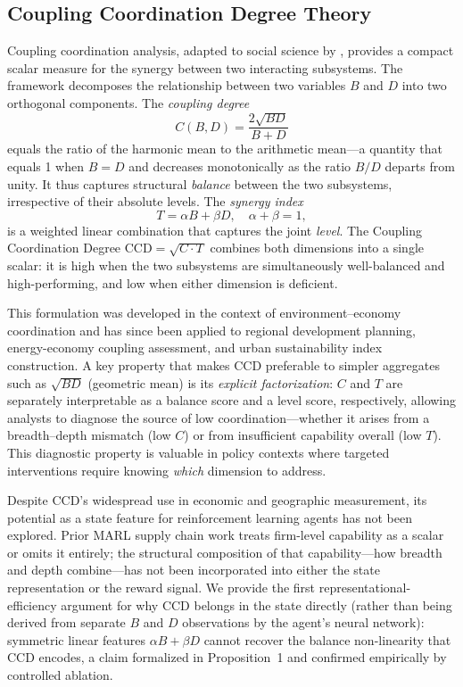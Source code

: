 \documentclass[11pt,a4paper]{article}
\theoremstyle{plain}
\theoremstyle{definition}
\newcommand{\CCD}{\mathrm{CCD}}
\begin{document}
\subsection{Coupling Coordination Degree Theory}

Coupling coordination analysis, adapted to social science by \citet{liao1999quantitative},
provides a compact scalar measure for the synergy between two interacting subsystems.  The
framework decomposes the relationship between two variables $B$ and $D$ into two orthogonal
components.  The \emph{coupling degree}
\[
  C(B,D) = \frac{2\sqrt{BD}}{B+D}
\]
equals the ratio of the harmonic mean to the arithmetic mean---a quantity that equals 1
when $B=D$ and decreases monotonically as the ratio $B/D$ departs from unity.  It thus
captures structural \emph{balance} between the two subsystems, irrespective of their
absolute levels.  The \emph{synergy index}
\[
  T = \alpha B + \beta D, \quad \alpha + \beta = 1,
\]
is a weighted linear combination that captures the joint \emph{level}.  The Coupling
Coordination Degree $\CCD = \sqrt{C \cdot T}$ combines both dimensions into a single
scalar: it is high when the two subsystems are simultaneously well-balanced and
high-performing, and low when either dimension is deficient.

This formulation was developed in the context of environment--economy coordination
\citep{liao1999quantitative} and has since been applied to regional development planning,
energy-economy coupling assessment, and urban sustainability index construction.  A key
property that makes CCD preferable to simpler aggregates such as $\sqrt{BD}$ (geometric
mean) is its \emph{explicit factorization}: $C$ and $T$ are separately interpretable as a
balance score and a level score, respectively, allowing analysts to diagnose the source of
low coordination---whether it arises from a breadth--depth mismatch (low $C$) or from
insufficient capability overall (low $T$).  This diagnostic property is valuable in
policy contexts where targeted interventions require knowing \emph{which} dimension to
address.

Despite CCD's widespread use in economic and geographic measurement, its potential as a
state feature for reinforcement learning agents has not been explored.  Prior MARL supply
chain work treats firm-level capability as a scalar or omits it entirely; the structural
composition of that capability---how breadth and depth combine---has not been incorporated
into either the state representation or the reward signal.  We provide the first
representational-efficiency argument for why CCD belongs in the state directly (rather
than being derived from separate $B$ and $D$ observations by the agent's neural network):
symmetric linear features $\alpha B + \beta D$ cannot recover the balance non-linearity
that CCD encodes, a claim formalized in Proposition~1 and confirmed empirically by
controlled ablation.
\end{document}
